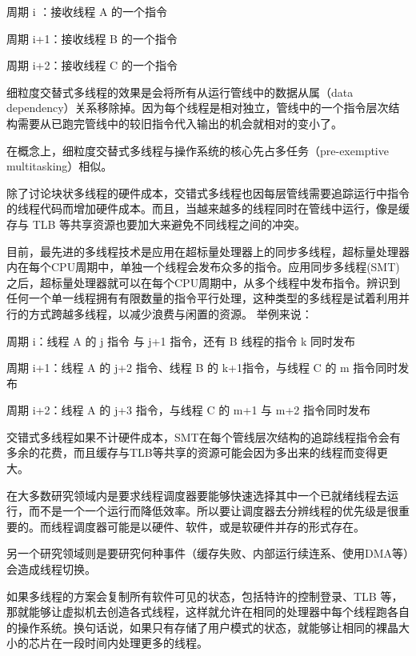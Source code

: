\begin{compactenum}
\item 周期 i ：接收线程 A 的一个指令
\item 周期 i+1：接收线程 B 的一个指令
\item 周期 i+2：接收线程 C 的一个指令
\end{compactenum}

细粒度交替式多线程的效果是会将所有从运行管线中的数据从属（data dependency）关系移除掉。因为每个线程是相对独立，管线中的一个指令层次结构需要从已跑完管线中的较旧指令代入输出的机会就相对的变小了。

在概念上，细粒度交替式多线程与操作系统的核心先占多任务（pre-exemptive multitasking）相似。

除了讨论块状多线程的硬件成本，交错式多线程也因每层管线需要追踪运行中指令的线程代码而增加硬件成本。而且，当越来越多的线程同时在管线中运行，像是缓存与 TLB 等共享资源也要加大来避免不同线程之间的冲突。

目前，最先进的多线程技术是应用在超标量处理器上的同步多线程，超标量处理器内在每个CPU周期中，单独一个线程会发布众多的指令。应用同步多线程(SMT)之后，超标量处理器就可以在每个CPU周期中，从多个线程中发布指令。辨识到任何一个单一线程拥有有限数量的指令平行处理，这种类型的多线程是试着利用并行的方式跨越多线程，以减少浪费与闲置的资源。 举例来说：

\begin{compactenum}
\item 周期 i：线程 A 的 j 指令 与 j+1 指令，还有 B 线程的指令 k 同时发布
\item 周期 i+1：线程 A 的 j+2 指令、线程 B 的 k+1指令，与线程 C 的 m 指令同时发布
\item 周期 i+2：线程 A 的 j+3 指令，与线程 C 的 m+1 与 m+2 指令同时发布
\end{compactenum}

交错式多线程如果不计硬件成本，SMT在每个管线层次结构的追踪线程指令会有多余的花费，而且缓存与TLB等共享的资源可能会因为多出来的线程而变得更大。


在大多数研究领域内是要求线程调度器要能够快速选择其中一个已就绪线程去运行，而不是一个一个运行而降低效率。所以要让调度器去分辨线程的优先级是很重要的。而线程调度器可能是以硬件、软件，或是软硬件并存的形式存在。

另一个研究领域则是要研究何种事件（缓存失败、内部运行续连系、使用DMA等）会造成线程切换。

如果多线程的方案会复制所有软件可见的状态，包括特许的控制登录、TLB 等，那就能够让虚拟机去创造各式线程，这样就允许在相同的处理器中每个线程跑各自的操作系统。换句话说，如果只有存储了用户模式的状态，就能够让相同的裸晶大小的芯片在一段时间内处理更多的线程。

